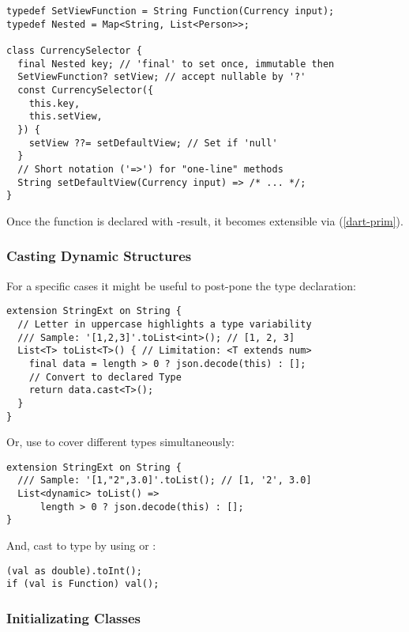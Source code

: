 \begin{lstlisting}
typedef SetViewFunction = String Function(Currency input);
typedef Nested = Map<String, List<Person>>;

class CurrencySelector {
  final Nested key; // 'final' to set once, immutable then
  SetViewFunction? setView; // accept nullable by '?'
  const CurrencySelector({
    this.key,
    this.setView,
  }) {
    setView ??= setDefaultView; // Set if 'null'
  }
  // Short notation ('=>') for "one-line" methods
  String setDefaultView(Currency input) => /* ... */;
}
\end{lstlisting}

\noindent Once the function is declared with -result, it becomes extensible via  (\ref{dart-prim}).


\subsubsection{Casting Dynamic Structures}

For a specific cases it might be useful to post-pone the type declaration:

\begin{lstlisting}
extension StringExt on String {
  // Letter in uppercase highlights a type variability
  /// Sample: '[1,2,3]'.toList<int>(); // [1, 2, 3] 
  List<T> toList<T>() { // Limitation: <T extends num>
    final data = length > 0 ? json.decode(this) : [];
    // Convert to declared Type
    return data.cast<T>();
  }
}
\end{lstlisting}

\noindent Or, use  to cover different types simultaneously:

\begin{lstlisting}
extension StringExt on String {
  /// Sample: '[1,"2",3.0]'.toList(); // [1, '2', 3.0] 
  List<dynamic> toList() =>
      length > 0 ? json.decode(this) : [];
}
\end{lstlisting}

\noindent And, cast to type by using  or :

\begin{lstlisting}
(val as double).toInt();
if (val is Function) val();
\end{lstlisting}


\subsubsection{Initializating Classes}

